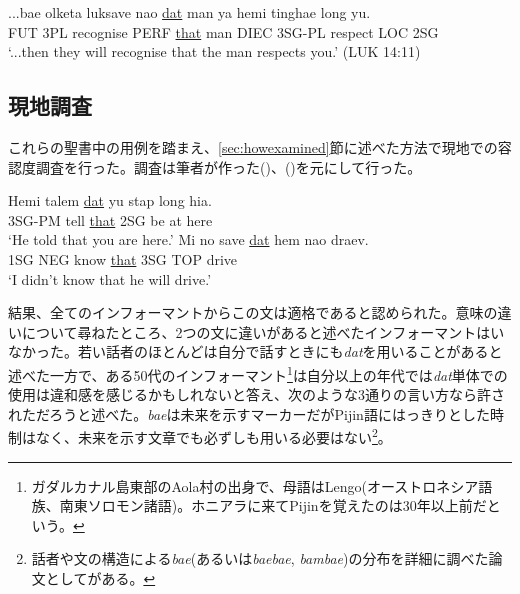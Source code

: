 \begin{exe}
\ex
\gll ...bae olketa luksave nao \underline{dat} man ya hemi tinghae long yu.\\
FUT 3PL recognise PERF \underline{that} man DIEC 3SG-PL respect LOC 2SG\\
\glt `...then they will recognise that the man respects you.' (LUK 14:11)
\end{exe}


\subsection{現地調査}\label{sec:datfield}

これらの聖書中の用例を踏まえ、\ref{sec:howexamined}節に述べた方法で現地での容認度調査を行った。調査は筆者が作った()、()を元にして行った。

\begin{exe}
\ex\label{dat1}
\gll Hemi talem \underline{dat} yu stap long hia.\\
3SG-PM tell \underline{that} 2SG be at here\\
\glt `He told that you are here.'
\ex\label{dat2}
\gll Mi no save \underline{dat} hem nao draev.\\
1SG NEG know \underline{that} 3SG TOP drive\\
\glt `I didn't know that he will drive.'
\end{exe}

結果、全てのインフォーマントからこの文は適格であると認められた。意味の違いについて尋ねたところ、2つの文に違いがあると述べたインフォーマントはいなかった。若い話者のほとんどは自分で話すときにも\textit{dat}を用いることがあると述べた一方で、ある50代のインフォーマント\footnote{ガダルカナル島東部のAola村の出身で、母語はLengo(オーストロネシア語族、南東ソロモン諸語)。ホニアラに来てPijinを覚えたのは30年以上前だという。}は自分以上の年代では\textit{dat}単体での使用は違和感を感じるかもしれないと答え、次のような3通りの言い方なら許されただろうと述べた。\textit{bae}は未来を示すマーカーだがPijin語にはっきりとした時制はなく\citep{eric}、未来を示す文章でも必ずしも用いる必要はない\footnote{
  話者や文の構造による\textit{bae}(あるいは\textit{baebae}, \textit{bambae})の分布を詳細に調べた論文として\cite{bae}がある。
}。

